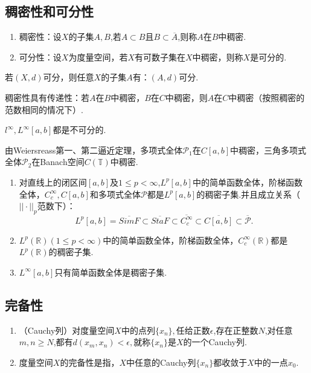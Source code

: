 \documentclass[lang=cn,10pt]{elegantbook}
\begin{document}
	\subsection{稠密性和可分性}
	\begin{definition}
		\begin{enumerate}
			\item 稠密性：设\(X\)的子集\(A,B\),若\(A\subset B\)且\(B \subset \overline{A}\),则称\(A\)在\(B\)中稠密.
			\item 可分性：设\(X\)为度量空间，若\(X\)有可数子集在\(X\)中稠密，则称\(X\)是可分的.
		\end{enumerate}
	\end{definition}
	\begin{property}[子空间可分性]
		若\((X,d)\)可分，则任意\(X\)的子集\(A\)有：\((A,d)\)可分.
	\end{property}
	\begin{note}
		稠密性具有传递性：若\(A\)在\(B\)中稠密，\(B\)在\(C\)中稠密，则\(A\)在\(C\)中稠密（按照稠密的范数相同的情况下）.
	\end{note}
	\begin{example}
		\(l^\infty,L^\infty[a,b]\)都是不可分的.
	\end{example}
	\begin{example}
		由Weiersreass第一、第二逼近定理，多项式全体\(\mathcal{P}_1\)在\(C[a,b]\)中稠密，三角多项式全体\(\mathcal{P}_2\)在Banach空间\(C(\mathbb{T})\)中稠密.
	\end{example}
	\begin{example}
		\begin{enumerate}
			\item 对直线上的闭区间\([a,b]\)及\(1\le p<\infty\),\(L^p[a,b]\)中的简单函数全体，阶梯函数全体，\(C_c^\infty,C[a,b]\)和多项式全体\(\mathcal{P}\)都是\(L^p[a,b]\)的稠密子集.并且成立关系（\(||\cdot||_p\)范数下）：
			\[L^p[a,b]=\overline{SimF}\subset\overline{StaF}\subset\overline{C_c^\infty}\subset\overline{C[a,b]}\subset\overline{\mathcal{P}}.\]
			\item \(L^p(\mathbb{R})(1\le p<\infty)\)中的简单函数全体，阶梯函数全体，\(C_c^\infty(\mathbb{R})\)都是\(L^p(\mathbb{R})\)的稠密子集.
			\item \(L^\infty [a,b]\)只有简单函数全体是稠密子集.
		\end{enumerate}
	\end{example}
	
	\subsection{完备性}
	\begin{definition}
		\begin{enumerate}
			\item （Cauchy列）对度量空间\(X\)中的点列\(\{x_n\},\)任给正数\(\epsilon\),存在正整数\(N\),对任意\(m,n\ge N\),都有\(d(x_m,x_n)<\epsilon,\)就称\(\{x_n\}\)是\(X\)的一个Cauchy列.
			\item 度量空间\(X\)的完备性是指，\(X\)中任意的Cauchy列\(\{x_n\}\)都收敛于\(X\)中的一点\(x_0.\)
		\end{enumerate}
	\end{definition}
	
\end{document}
